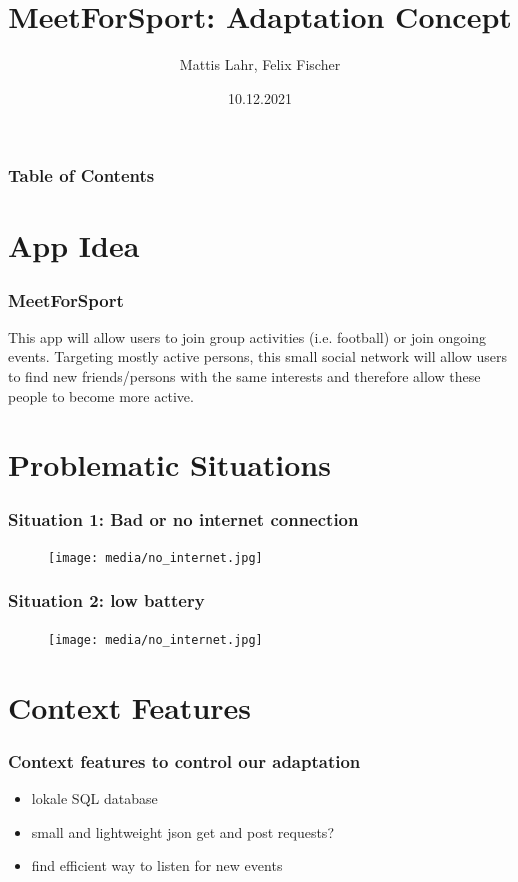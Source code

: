 \documentclass[aspectratio=169]{beamer}
\title{MeetForSport: Adaptation Concept}
\author{Mattis Lahr, Felix Fischer}
\date{10.12.2021}
\begin{document}
\maketitle



\begin{frame}
    \frametitle{Table of Contents}
    \tableofcontents
\end{frame}



\section{App Idea}
\begin{frame}
\frametitle{MeetForSport}
This app will allow users to join group activities (i.e. football) or join ongoing events.
Targeting mostly active persons, this small social network will allow users  to find new friends/persons with the same interests and therefore allow these people to become more active.
\end{frame}

\section{Problematic Situations}
\begin{frame}   
	\frametitle{Situation 1:  Bad or no internet connection}
	 \begin{figure}
		\centering
		\texttt{[image: media/no\_internet.jpg]}
	\end{figure}
\end{frame}
\begin{frame}   
	\frametitle{Situation 2: low battery}
	 \begin{figure}
		\centering
		\texttt{[image: media/no\_internet.jpg]}
	\end{figure}
\end{frame}




\section{Context Features}
\begin{frame}   
	\frametitle{Context features to control our adaptation}
	\begin{itemize}
		\item lokale SQL database
		\item small and lightweight json get and post requests?
		\item find efficient way to listen for new events
	\end{itemize}
\end{frame}
\end{document}
